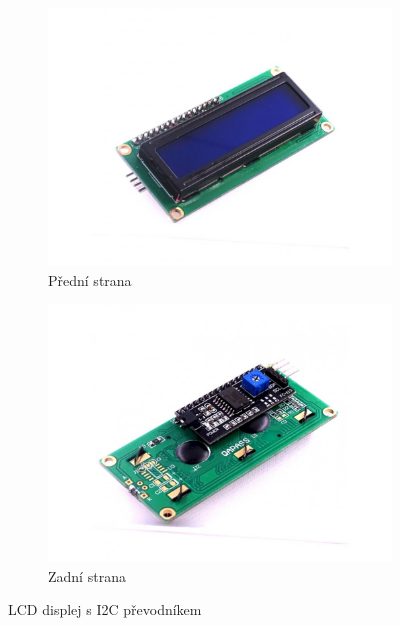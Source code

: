 \begin{figure}[hptb]
	\centering
	\begin{subfigure}{0.48\textwidth}
		\includegraphics[width=1\textwidth]{images/predni_LCD_s_I2C.jpg}
		\caption{Přední strana}
		\label{fig:PredniLCDDisplej}
	\end{subfigure}
	\hfill
	\begin{subfigure}{0.48\textwidth}
		\includegraphics[width=1\textwidth]{images/zadni_LCD_s_I2C.jpg}
		\caption{Zadní strana}
		\label{fig:ZadniLCDDisplej}
	\end{subfigure}
	\caption{LCD displej s I2C převodníkem \cite{laskakit_16x2_lcd}}
	\label{fig:LcdDisplej}
\end{figure}

